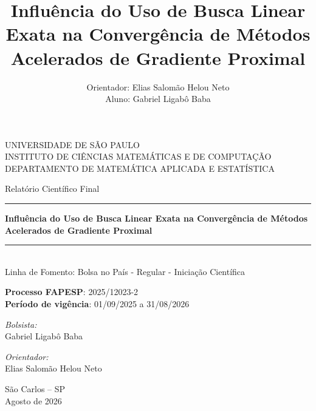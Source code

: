 \documentclass[12pt]{article}
\title{Influência do Uso de Busca Linear Exata na Convergência de Métodos Acelerados de Gradiente Proximal}
\author{Orientador: Elias Salomão Helou Neto\\Aluno: Gabriel Ligabô Baba}
\begin{document}
\begin{titlepage}
    \begin{center}
        {\large \sc UNIVERSIDADE DE SÃO PAULO} \\
        {\large \sc INSTITUTO DE CIÊNCIAS MATEMÁTICAS E DE COMPUTAÇÃO}\\[0.7cm]
        {\small \sc DEPARTAMENTO DE MATEMÁTICA APLICADA E ESTATÍSTICA}
        
        \vspace{4cm}
        
        {\large \sc Relatório Científico Final}\\
        \rule{\linewidth}{2pt}
        
        \vspace{0.7em}
        {\Large \bfseries Influência do Uso de Busca Linear Exata na Convergência de Métodos Acelerados de Gradiente Proximal}
        \vspace{0.2em}
        
        \rule{\linewidth}{2pt} \\
        {\small \sc Linha de Fomento: Bolsa no País - Regular - Iniciação Científica}
    \end{center}
    
    \vspace{1.8cm}
    
    \begin{flushleft}
        \textbf{Processo FAPESP}: 2025/12023-2\\
        \textbf{Período de vigência}: 01/09/2025 a 31/08/2026\\
    \end{flushleft}
    
    \vspace{1.8cm}
    
    \begin{minipage}{0.43\textwidth}
        \emph{Bolsista:}\\
        Gabriel Ligabô Baba
    \end{minipage}
    \hspace{1cm}
    \begin{minipage}{0.43\textwidth}
        \emph{Orientador:}\\
        Elias Salomão Helou Neto    
    \end{minipage}
    
    \vfill
    
    \begin{center}
        São Carlos -- SP \\
        Agosto de 2026
    \end{center}
\end{titlepage}
\end{document}
